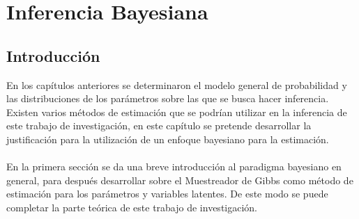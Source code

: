 \chapter{Inferencia Bayesiana}
\section{Introducci\'on}
En los cap\'itulos anteriores se determinaron el modelo general de probabilidad y las distribuciones de los par\'ametros sobre las que se busca hacer inferencia. Existen varios m\'etodos de estimaci\'on que se podr\'ian utilizar en la inferencia de este trabajo de investigaci\'on, en este cap\'itulo se pretende desarrollar la justificaci\'on para la utilizaci\'on de un enfoque bayesiano para la estimaci\'on.\\
\\
En la primera secci\'on se da una breve introducci\'on al paradigma bayesiano en general, para despu\'es desarrollar sobre el Muestreador de Gibbs como m\'etodo de estimaci\'on para los par\'ametros y variables latentes. De este modo se puede completar la parte te\'orica de este trabajo de investigaci\'on.  
